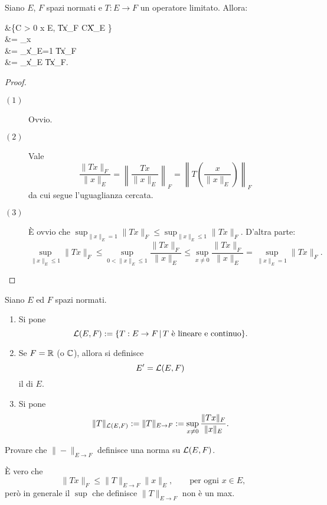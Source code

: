 \begin{lemma}
	Siano $E$, $F$ spazi normati e $T:E \to F$ un operatore limitato. Allora:
	\begin{eqalign*}
		&\inf\{C > 0 \suchthat \forall x \in E,\; \|Tx\|_F \leq C\|X\|_E \}\\&= \sup_{x } \\
		&= \sup_{\|x\|_E=1} \|Tx\|_F\\
		&= \sup_{\|x\|_E } \|Tx\|_F.
	\end{eqalign*}
\end{lemma}
\begin{proof}
	\leavevmode
	\begin{description}
		\item[$(1)$] Ovvio.
		\item[$(2)$] Vale
		$$
			\frac{\|Tx\|_F}{\|x\|_E} = \left\| \frac{Tx}{\|x\|_E} \right\|_F = \left\|T\left(\frac{x}{\|x\|_E}\right)\right\|_F
		$$
		da cui segue l'uguaglianza cercata.
		\item[$(3)$] È ovvio che $\sup_{\|x\|_E=1} \|Tx\|_F \leq \sup_{\|x\|_E \leq 1} \|Tx\|_F$. D'altra parte:
		$$
			\sup_{\|x\|_E \leq 1} \|Tx\|_F \leq \sup_{0 < \|x\|_E \leq 1} \frac{\|Tx\|_F}{\|x\|_E} \leq  \sup_{x \neq 0} \frac{\|Tx\|_F}{\|x\|_E} = \sup_{\|x\|_E = 1} \|Tx\|_F.
		$$
	\end{description}
\end{proof}

\begin{definition}
	Siano $E$ ed $F$ spazi normati.
	\begin{enumerate}
		\item Si pone
		$$
			\mathcal{L}(E, F) := \{ T:E \to F \,|\, \text{$T$ è lineare e continuo}\}.
		$$
		\item Se $F=\mathbb{R}$ (o $\mathbb{C}$), allora si definisce
		$$
			E' = \mathcal{L}(E, F)
		$$
		il  di $E$.
		\item Si pone
		$$
			\|T\|_{\mathcal{L}(E,F)} := \|T\|_{E \to F} := \sup_{x \neq 0} \frac{\|Tx\|_F}{\|x\|_E}.
		$$
	\end{enumerate}
\end{definition}

\begin{exercise}
	Provare che $\|-\|_{E \to F}$ definisce una norma su $\mathcal{L}(E,F)$.
\end{exercise}

\begin{remark}
	È vero che
	$$
		\|Tx\|_F \leq \|T\|_{E \to F} \|x\|_E, \qquad \text{per ogni $x \in E$},
	$$
	però in generale il $\sup$ che definisce $\|T\|_{E \to F}$ non è un max.
\end{remark}

